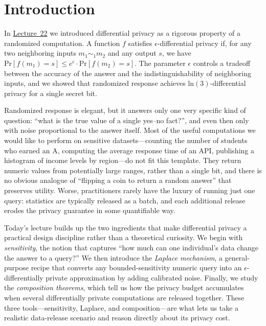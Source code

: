 \documentclass[11pt]{article}
\newcommand{\courseurl}{https://15316-cmu.github.io/2026/}
\newcommand{\pr}{\mathrm{Pr}}
\begin{document}
\maketitle

\section{Introduction}

In \href{\courseurl/lectures/22-diffprivacy.pdf}{Lecture~22} we introduced
differential privacy as a rigorous property of a randomized
computation. A function $f$ satisfies $\epsilon$-differential privacy if, for
any two neighboring inputs $m_1 \sim_1 m_2$ and any output $s$, we have
$\pr[f(m_1) = s] \leq e^\epsilon \cdot \pr[f(m_2) = s]$.  The parameter
$\epsilon$ controls a tradeoff between the accuracy of the answer and the
indistinguishability of neighboring inputs, and we showed that randomized
response achieves $\mathrm{ln}(3)$-differential privacy for a single secret
bit.

Randomized response is elegant, but it answers only one very specific kind of
question: ``what is the true value of a single yes--no fact?'', and even then
only with noise proportional to the answer itself.  Most of the useful
computations we would like to perform on sensitive datasets---counting the
number of students who earned an A, computing the average response time of an
API, publishing a histogram of income levels by region---do not fit this
template.  They return numeric values from potentially large ranges, rather
than a single bit, and there is no obvious analogue of ``flipping a coin to
return a random answer'' that preserves utility.  Worse, practitioners rarely
have the luxury of running just one query: statistics are typically released
as a batch, and each additional release erodes the privacy guarantee in some
quantifiable way.

Today's lecture builds up the two ingredients that make differential privacy a
practical design discipline rather than a theoretical curiosity.  We begin
with \emph{sensitivity}, the notion that captures ``how much can one
individual's data change the answer to a query?''  We then introduce the
\emph{Laplace mechanism}, a general-purpose recipe that converts any
bounded-sensitivity numeric query into an $\epsilon$-differentially private
approximation by adding calibrated noise.  Finally, we study the
\emph{composition theorems}, which tell us how the privacy budget accumulates
when several differentially private computations are released together.
These three tools---sensitivity, Laplace, and composition---are what lets us
take a realistic data-release scenario and reason directly about its privacy
cost.
\end{document}
